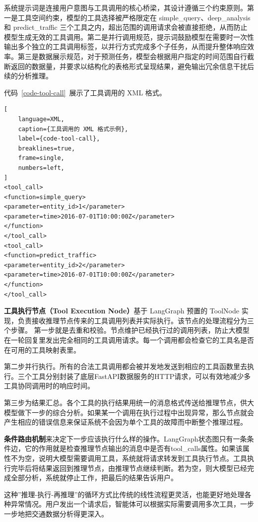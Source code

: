 系统提示词是连接用户意图与工具调用的核心桥梁，其设计遵循三个约束原则。第一是工具空间约束，模型的工具选择被严格限定在 simple\_query、deep\_analysis 和 predict\_traffic 三个工具之内，超出范围的调用请求会被直接拒绝，从而防止模型生成无效的工具调用。第二是并行调用规范，提示词鼓励模型在需要时一次性输出多个独立的工具调用标签，以并行方式完成多个子任务，从而提升整体响应效率。第三是数据展示规范，对于预测任务，模型会根据用户指定的时间范围自行截断返回的数据量，并要求以结构化的表格形式呈现结果，避免输出冗余信息干扰后续的分析推理。

\vspace{1em}

代码~\ref{code-tool-call}~展示了工具调用的 XML 格式。

\begin{lstlisting}[
    language=XML,
    caption={工具调用的 XML 格式示例},
    label={code-tool-call},
    breaklines=true,
    frame=single,
    numbers=left,
]
<tool_call>
<function=simple_query>
<parameter=entity_id>1</parameter>
<parameter=time>2016-07-01T10:00:00Z</parameter>
</function>
</tool_call>
<tool_call>
<function=predict_traffic>
<parameter=entity_id>2</parameter>
<parameter=time>2016-07-01T10:00:00Z</parameter>
</function>
</tool_call>
\end{lstlisting}

\textbf{工具执行节点（Tool Execution Node）}基于 LangGraph 预置的 ToolNode 实现，负责接收推理节点传来的工具调用列表并实际执行。该节点的处理流程分为三个步骤。
第一步就是去重和校验。节点维护已经执行过的调用列表，防止大模型在一轮回复里发出完全相同的工具调用请求。每一个调用都会检查它的工具名是否在可用的工具映射表里。

第二步并行执行。所有的合法工具调用都会被并发地发送到相应的工具函数里去执行。三个工具分别封装了底层FastAPI数据服务的HTTP请求，可以有效地减少多工具协同调用时的响应时间。

第三步为结果汇总。各个工具的执行结果用统一的消息格式传送给推理节点，供大模型做下一步的综合分析。如果某一个调用在执行过程中出现异常，那么节点就会产生相应的错误信息来保证系统不会因为单个工具的故障而中断整个推理过程。

\textbf{条件路由机制}来决定下一步应该执行什么样的操作。LangGraph状态图只有一条条件边，它的作用就是检查推理节点输出的消息中是否有tool\_calls属性。如果该属性不为空，说明大模型需要调用工具，系统就将请求转发到工具执行节点。工具执行完毕后将结果返回到推理节点，由推理节点继续判断。若为空，则大模型已经完成全部分析，系统就停止工作，把最后的结果告诉用户。

这种”推理-执行-再推理”的循环方式比传统的线性流程更灵活，也能更好地处理各种异常情况。用户发出一个请求后，智能体可以根据实际需要调用多次工具，一步一步地把交通数据分析得更深入。

